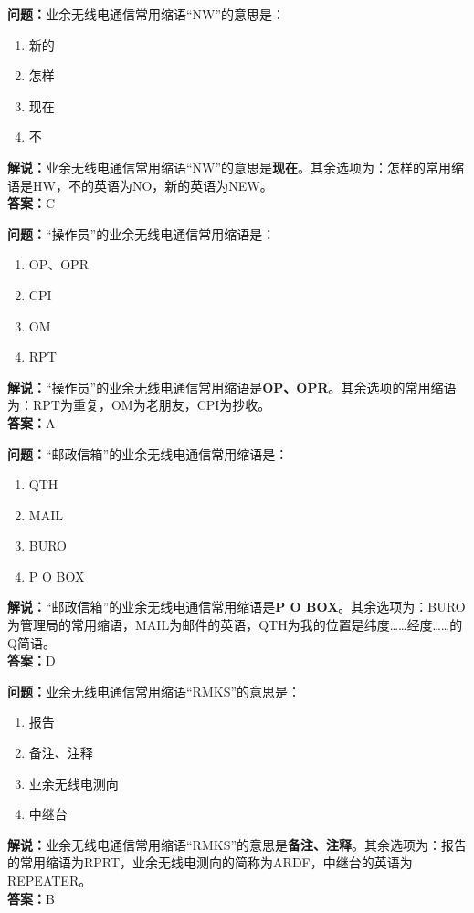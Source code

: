 \bigskip


\noindent\textbf{问题：}业余无线电通信常用缩语“NW”的意思是：
\begin{enumerate}[label=\Alph*), leftmargin=3em]
\item 新的
\item 怎样
\item 现在
\item 不
\end{enumerate}
\noindent\textbf{解说：}业余无线电通信常用缩语“NW”的意思是\textbf{现在}。其余选项为：怎样的常用缩语是HW，不的英语为NO，新的英语为NEW。\\\noindent\textbf{答案：}C



\bigskip


\noindent\textbf{问题：}“操作员”的业余无线电通信常用缩语是：
\begin{enumerate}[label=\Alph*), leftmargin=3em]
\item OP、OPR
\item CPI
\item OM
\item RPT
\end{enumerate}
\noindent\textbf{解说：}“操作员”的业余无线电通信常用缩语是\textbf{OP、OPR}。其余选项的常用缩语为：RPT为重复，OM为老朋友，CPI为抄收。\\\noindent\textbf{答案：}A



\bigskip


\noindent\textbf{问题：}“邮政信箱”的业余无线电通信常用缩语是：
\begin{enumerate}[label=\Alph*), leftmargin=3em]
\item QTH
\item MAIL
\item BURO
\item P O BOX
\end{enumerate}
\noindent\textbf{解说：}“邮政信箱”的业余无线电通信常用缩语是\textbf{P O BOX}。其余选项为：BURO为管理局的常用缩语，MAIL为邮件的英语，QTH为我的位置是纬度……经度……的Q简语。\\\noindent\textbf{答案：}D



\bigskip


\noindent\textbf{问题：}业余无线电通信常用缩语“RMKS”的意思是：
\begin{enumerate}[label=\Alph*), leftmargin=3em]
\item 报告
\item 备注、注释
\item 业余无线电测向
\item 中继台
\end{enumerate}
\noindent\textbf{解说：}业余无线电通信常用缩语“RMKS”的意思是\textbf{备注、注释}。其余选项为：报告的常用缩语为RPRT，业余无线电测向的简称为ARDF，中继台的英语为REPEATER。\\\noindent\textbf{答案：}B



